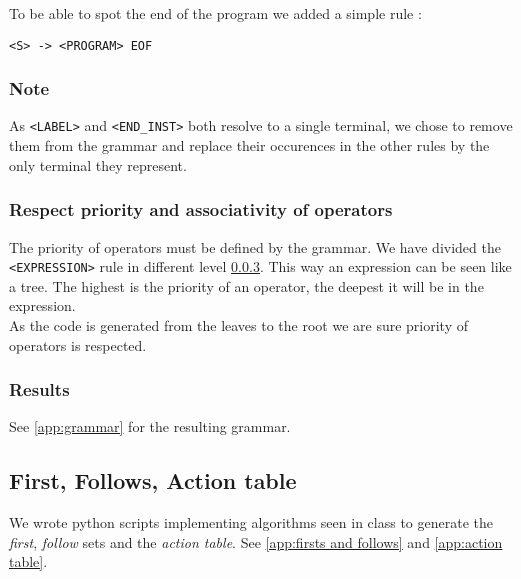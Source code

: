 To be able to spot the end of the program we added a simple rule :

\begin{center}
\begin{BVerbatim}[commandchars=\\\{\}]
<S> -> <PROGRAM> EOF
\end{BVerbatim}
\end{center}

\subsubsection{Note}

As \verb!<LABEL>! and \verb!<END_INST>! both resolve to a single terminal, we chose to remove them from the grammar and replace their occurences in the other rules by the only terminal they represent.

\subsubsection{Respect priority and associativity of operators}

The priority of operators must be defined by the grammar. We have divided the \verb!<EXPRESSION>! rule in different level \ref{expression}. This way an expression can be seen like a tree. The highest is the priority of an operator, the deepest it will be in the expression.\\ As the code is generated from the leaves to the root we are sure priority of operators is respected.  



\subsubsection{Results}
\label{expression}
See \ref{app:grammar} for the resulting grammar.

\subsection{First, Follows, Action table}

We wrote python scripts implementing algorithms seen in class to generate the \emph{first}, \emph{follow} sets and the \emph{action table}. See \ref{app:firsts and follows} and \ref{app:action table}.

